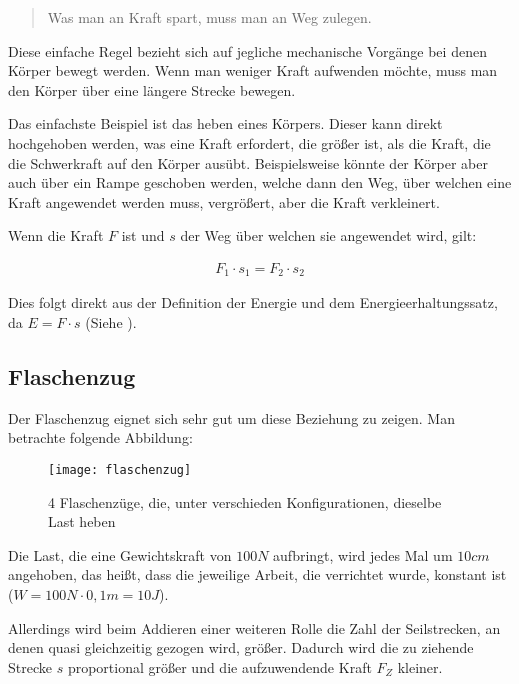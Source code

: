 \begin{quote}
	\glqq Was man an Kraft spart, muss man an Weg zulegen.\grqq
\end{quote}

\noindent Diese einfache Regel bezieht sich auf jegliche mechanische Vorgänge bei denen Körper bewegt werden. Wenn man weniger Kraft aufwenden möchte, muss man den Körper über eine längere Strecke bewegen. 

Das einfachste Beispiel ist das heben eines Körpers. Dieser kann direkt hochgehoben werden, was eine Kraft erfordert, die größer ist, als die Kraft, die die Schwerkraft auf den Körper ausübt. Beispielsweise könnte der Körper aber auch über ein Rampe geschoben werden, welche dann den Weg, über welchen eine Kraft angewendet werden muss, vergrößert, aber die Kraft verkleinert. 

Wenn die Kraft $F$ ist und $s$ der Weg über welchen sie angewendet wird, gilt:

\begin{align}
	F_{1} \cdot s_1 = F_{2} \cdot s_2
\end{align}

\noindent Dies folgt direkt aus der Definition der Energie und dem Energieerhaltungssatz, da $E=F \cdot s$ (Siehe ).

\subsection{Flaschenzug}

Der Flaschenzug eignet sich sehr gut um diese Beziehung zu zeigen. Man betrachte folgende Abbildung:

\begin{figure}[!h]
	\texttt{[image: flaschenzug]}
	\caption{4 Flaschenzüge, die, unter verschieden Konfigurationen, dieselbe Last heben}
	\label{fig:flaschenzug}
\end{figure}

Die Last, die eine Gewichtskraft von $100N$ aufbringt, wird jedes Mal um $10cm$ angehoben, das heißt, dass die jeweilige Arbeit, die verrichtet wurde, konstant ist ($W = 100N \cdot 0,1m = 10J$).

Allerdings wird beim Addieren einer weiteren Rolle die Zahl der Seilstrecken, an denen quasi gleichzeitig gezogen wird, größer. Dadurch wird die zu ziehende Strecke $s$ proportional größer und die aufzuwendende Kraft $F_Z$ kleiner.

